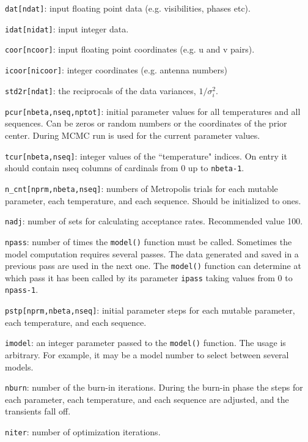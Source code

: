 \documentclass[preprint2]{aastex}
\begin{document}
\verb|dat[ndat]|: input floating point data (e.g. visibilities, phases etc).

\verb|idat[nidat]|: input integer data.

\verb|coor[ncoor]|: input floating point coordinates (e.g. u and v pairs).

\verb|icoor[nicoor]|: integer coordinates (e.g. antenna numbers)
             
\verb|std2r[ndat]|: the reciprocals of the data variances, $1/\sigma^2_i$.

\verb|pcur[nbeta,nseq,nptot]|: initial parameter values for all temperatures and
                        all sequences. Can be zeros or random numbers or
                        the coordinates of the prior center. During MCMC
                        run is used for the current parameter values.

\verb|tcur[nbeta,nseq]|: integer values of the ``temperature" indices. On entry it
                  should contain nseq columns of cardinals from 0 up to
                  \verb|nbeta-1|.

\verb|n_cnt[nprm,nbeta,nseq]|: numbers of Metropolis trials for each mutable
                        parameter, each temperature, and each sequence.
                        Should be initialized to ones.

\verb|nadj|: number of sets for calculating acceptance rates. Recommended value 100.

\verb|npass|: number of times the \verb|model()| function must be called. Sometimes
       the model computation requires several passes. The data generated and saved in a
       previous pass are used in the next one. The \verb|model()| function
       can determine at which pass it has been called by its parameter \verb|ipass|
       taking values from 0 to \verb|npass-1|.

\verb|pstp[nprm,nbeta,nseq]|: initial parameter steps for each mutable parameter,
                       each temperature, and each sequence.
                       
\verb|imodel|: an integer parameter passed to the \verb|model()| function. The usage is
        arbitrary. For example, it may be a model number to select between
        several models.

\verb|nburn|: number of the burn-in iterations. During the burn-in phase the steps
       for each parameter, each temperature, and each sequence are adjusted,
       and the transients fall off.

\verb|niter|: number of optimization iterations.
\end{document}
